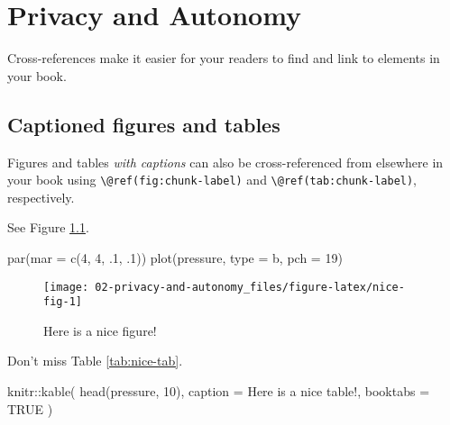 \documentclass[
]{book}
\newenvironment{Shaded}{\begin{snugshade}}{\end{snugshade}}
\newcommand{\AttributeTok}[1]{\textcolor[rgb]{0.77,0.63,0.00}{#1}}
\newcommand{\ConstantTok}[1]{\textcolor[rgb]{0.00,0.00,0.00}{#1}}
\newcommand{\DecValTok}[1]{\textcolor[rgb]{0.00,0.00,0.81}{#1}}
\newcommand{\FunctionTok}[1]{\textcolor[rgb]{0.00,0.00,0.00}{#1}}
\newcommand{\NormalTok}[1]{#1}
\newcommand{\SpecialCharTok}[1]{\textcolor[rgb]{0.00,0.00,0.00}{#1}}
\newcommand{\StringTok}[1]{\textcolor[rgb]{0.31,0.60,0.02}{#1}}
\theoremstyle{definition}
\theoremstyle{definition}
\theoremstyle{definition}
\theoremstyle{definition}
\theoremstyle{remark}
\begin{document}
\hypertarget{ch-privacy-and-autonomy}{%
\chapter{Privacy and Autonomy}\label{ch-privacy-and-autonomy}}

Cross-references make it easier for your readers to find and link to elements in your book.

\hypertarget{captioned-figures-and-tables}{%
\section{Captioned figures and tables}\label{captioned-figures-and-tables}}

Figures and tables \emph{with captions} can also be cross-referenced from elsewhere in your book using \texttt{\textbackslash{}@ref(fig:chunk-label)} and \texttt{\textbackslash{}@ref(tab:chunk-label)}, respectively.

See Figure \ref{fig:nice-fig}.

\begin{Shaded}
\begin{Highlighting}[]
\FunctionTok{par}\NormalTok{(}\AttributeTok{mar =} \FunctionTok{c}\NormalTok{(}\DecValTok{4}\NormalTok{, }\DecValTok{4}\NormalTok{, .}\DecValTok{1}\NormalTok{, .}\DecValTok{1}\NormalTok{))}
\FunctionTok{plot}\NormalTok{(pressure, }\AttributeTok{type =} \StringTok{\textquotesingle{}b\textquotesingle{}}\NormalTok{, }\AttributeTok{pch =} \DecValTok{19}\NormalTok{)}
\end{Highlighting}
\end{Shaded}

\begin{figure}

{\centering \texttt{[image: 02-privacy-and-autonomy\_files/figure-latex/nice-fig-1]} 

}

\caption{Here is a nice figure!}\label{fig:nice-fig}
\end{figure}

Don't miss Table \ref{tab:nice-tab}.

\begin{Shaded}
\begin{Highlighting}[]
\NormalTok{knitr}\SpecialCharTok{::}\FunctionTok{kable}\NormalTok{(}
  \FunctionTok{head}\NormalTok{(pressure, }\DecValTok{10}\NormalTok{), }\AttributeTok{caption =} \StringTok{\textquotesingle{}Here is a nice table!\textquotesingle{}}\NormalTok{,}
  \AttributeTok{booktabs =} \ConstantTok{TRUE}
\NormalTok{)}
\end{Highlighting}
\end{Shaded}
\end{document}
